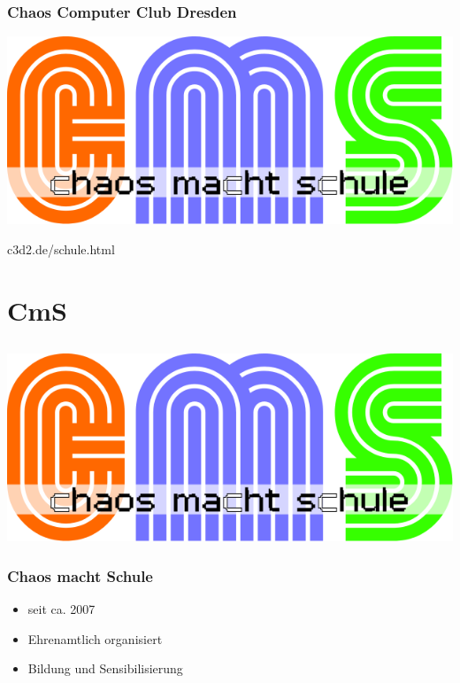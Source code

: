 \documentclass[12pt]{beamer}
\begin{document}
\begin{frame}	
	\frametitle{Chaos Computer Club Dresden}
	\begin{center}
		\includegraphics[height=0.2\textheight]{img/cms-text.png}
		\vspace{0.4cm}

		c3d2.de/schule.html
	\end{center}
\end{frame}	


\section{CmS}
\subsection{}

\begin{frame}
	\begin{center}
    	\includegraphics[height=0.5\textheight]{img/cms-text.png}
    \end{center}
\end{frame}
  
\begin{frame}
	\frametitle{Chaos macht Schule}
	\begin{itemize}
		\item<1-> seit ca. 2007
		\item<2-> Ehrenamtlich organisiert
		\item<3-> Bildung und Sensibilisierung
	\end{itemize}
\end{frame}
  
\end{document}
